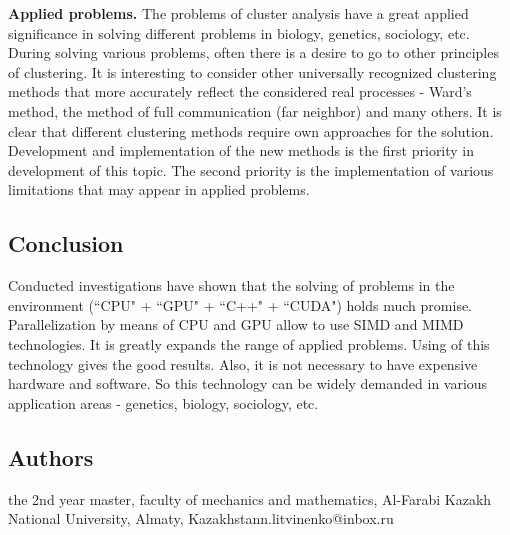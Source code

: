 \documentclass{TAACpaper}
\begin{document}
\textbf {Applied problems.} The problems of cluster analysis have a great applied significance in solving different problems in biology, genetics, sociology, etc. During solving various problems, often there is a desire to go to other principles of clustering. It is interesting to consider other universally recognized clustering methods that more accurately reflect the considered real processes - Ward's method, the method of full communication (far neighbor) and many others. It is clear that different clustering methods require own approaches for the solution. Development and implementation of the new methods is the first priority in development of this topic. The second priority is the implementation of various limitations that may appear in applied problems.


\subsection{Conclusion}
Conducted investigations have shown that the solving of problems in the environment (``CPU" + ``GPU" + ``C++" + ``CUDA") holds much promise. Parallelization by means of CPU and GPU allow to use SIMD and MIMD technologies. It is greatly expands the range of applied problems. Using of this technology gives the good results. Also, it is not necessary to have expensive hardware and software. So this technology can be widely demanded in various application areas - genetics, biology, sociology, etc.







\subsection{Authors}

\author{Natalya Litvinenko}{the 2nd year master, faculty of mechanics and mathematics,
Al-Farabi Kazakh National University, Almaty, Kazakhstan}{n.litvinenko@inbox.ru}
\end{document}
